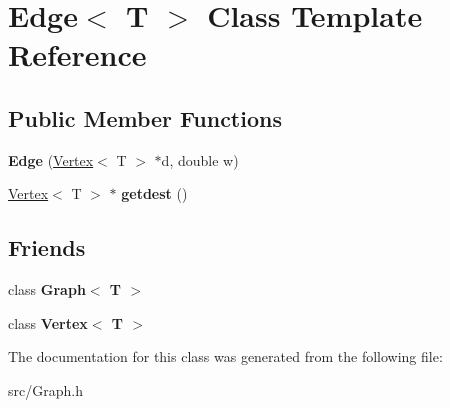 \hypertarget{class_edge}{}\section{Edge$<$ T $>$ Class Template Reference}
\label{class_edge}
\subsection*{Public Member Functions}
\begin{DoxyCompactItemize}
\item 
\hypertarget{class_edge_a9da861a03f920c89984be33515a5d870}{}\label{class_edge_a9da861a03f920c89984be33515a5d870} 
{\bfseries Edge} (\hyperlink{class_vertex}{Vertex}$<$ T $>$ $\ast$d, double w)
\item 
\hypertarget{class_edge_afa05210b87db69931486907be072c23a}{}\label{class_edge_afa05210b87db69931486907be072c23a} 
\hyperlink{class_vertex}{Vertex}$<$ T $>$ $\ast$ {\bfseries getdest} ()
\end{DoxyCompactItemize}
\subsection*{Friends}
\begin{DoxyCompactItemize}
\item 
\hypertarget{class_edge_aefa9b76cd57411c5354e5620dc2d84dd}{}\label{class_edge_aefa9b76cd57411c5354e5620dc2d84dd} 
class {\bfseries Graph$<$ T $>$}
\item 
\hypertarget{class_edge_a2e120a12dec663fa334633b4f26cbed8}{}\label{class_edge_a2e120a12dec663fa334633b4f26cbed8} 
class {\bfseries Vertex$<$ T $>$}
\end{DoxyCompactItemize}


The documentation for this class was generated from the following file\+:\begin{DoxyCompactItemize}
\item 
src/Graph.\+h\end{DoxyCompactItemize}
